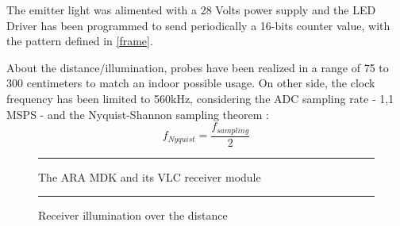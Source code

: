 The emitter light was alimented with a 28 Volts power supply and the LED Driver has been programmed to send periodically a 16-bits counter value, with the pattern defined in \ref{frame}.

About the distance/illumination, probes have been realized in a range of 75 to 300 centimeters to match an indoor possible usage. On other side, the clock frequency has been limited to 560kHz, considering the ADC sampling rate - 1,1 MSPS - and the Nyquist-Shannon sampling theorem : 
\begin{equation}
f_{Nyquist}  = \frac{f_{sampling}}{2}
\label{eq:nyquist}
\end{equation}

\begin{figure}[htbp]
  \centering
    \rule{35em}{0.5pt}
  \caption[The ARA MDK and its VLC receiver module]{The ARA MDK and its VLC receiver module}
  \label{fig:receiver}
\end{figure}

\begin{figure}[htbp]
	\centering
		\rule{35em}{0.5pt}
		\caption{Receiver illumination over the distance}
		\label{fig:led}
	\end{figure}

